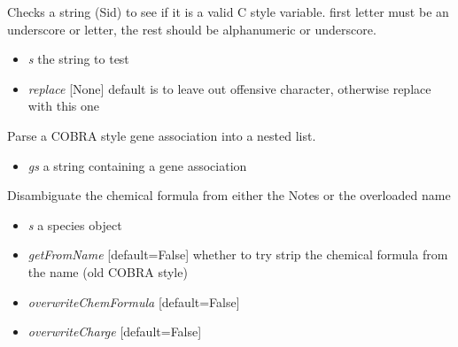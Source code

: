 \documentclass[a4paper,11pt,english]{sphinxmanual}
\begin{document}

\begin{fulllineitems}
\label{modules_doc:cbmpy.CBCommon.fixId}
Checks a string (Sid) to see if it is a valid C style variable. first letter must be an underscore or letter,
the rest should be alphanumeric or underscore.
\begin{itemize}
\item {} 
\emph{s} the string to test

\item {} 
\emph{replace} {[}None{]} default is to leave out offensive character, otherwise replace with this one

\end{itemize}

\end{fulllineitems}


\begin{fulllineitems}
\label{modules_doc:cbmpy.CBCommon.parseGeneAssociation}
Parse a COBRA style gene association into a nested list.
\begin{itemize}
\item {} 
\emph{gs} a string containing a gene association

\end{itemize}

\end{fulllineitems}


\begin{fulllineitems}
\label{modules_doc:cbmpy.CBCommon.processSpeciesChargeChemFormulaAnnot}
Disambiguate the chemical formula from either the Notes or the overloaded name
\begin{itemize}
\item {} 
\emph{s} a species object

\item {} 
\emph{getFromName} {[}default=False{]} whether to try strip the chemical formula from the name (old COBRA style)

\item {} 
\emph{overwriteChemFormula} {[}default=False{]}

\item {} 
\emph{overwriteCharge} {[}default=False{]}

\end{itemize}

\end{fulllineitems}
\end{document}

